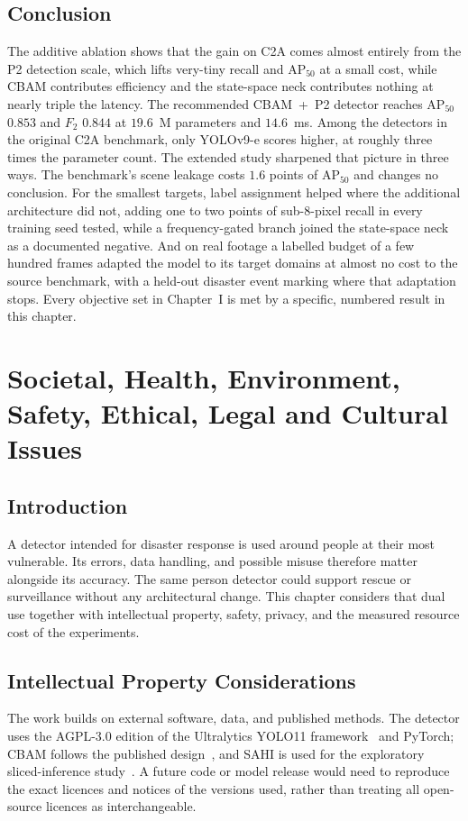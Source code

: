 \documentclass[12pt,a4paper,oneside]{report}
\begin{document}
\section{Conclusion}
The additive ablation shows that the gain on C2A comes almost entirely from
the P2 detection scale, which lifts very-tiny recall and $\mathrm{AP}_{50}$
at a small cost, while CBAM contributes efficiency and the state-space neck
contributes nothing at nearly triple the latency. The recommended CBAM~+~P2
detector reaches $\mathrm{AP}_{50}$ $0.853$ and $F_2$ $0.844$ at $19.6$~M
parameters and $14.6$~ms. Among the detectors in the original C2A benchmark,
only YOLOv9-e scores higher, at roughly three times the parameter count. The
extended study sharpened that picture in three ways. The benchmark's scene
leakage costs $1.6$ points of $\mathrm{AP}_{50}$ and changes no conclusion.
For the smallest targets, label assignment helped where the additional
architecture did not, adding one to two points of sub-8-pixel
recall in every training seed tested, while a frequency-gated branch joined
the state-space neck as a documented negative. And on real footage a labelled
budget of a few hundred frames adapted the model to its target domains at
almost no cost to the source benchmark, with a held-out disaster event
marking where that adaptation stops. Every objective set in Chapter~I is met
by a specific, numbered result in this chapter.
 \newpage 
 \newpage \chapter{Societal, Health, Environment, Safety, Ethical, Legal and Cultural Issues}

\section{Introduction}
A detector intended for disaster response is used around people at their most
vulnerable. Its errors, data handling, and possible misuse therefore matter
alongside its accuracy. The same person detector could support rescue or
surveillance without any architectural change. This chapter considers that
dual use together with intellectual property, safety, privacy, and the measured
resource cost of the experiments.

\section{Intellectual Property Considerations}
The work builds on external software, data, and published methods. The detector
uses the AGPL-3.0 edition of the Ultralytics YOLO11
framework~\cite{jocher2024yolo11} and PyTorch; CBAM
follows the published design~\cite{woo2018cbam}, and SAHI is used for the
exploratory sliced-inference study~\cite{akyon2022sahi}. A future code or model
release would need to reproduce the exact licences and notices of the versions
used, rather than treating all open-source licences as interchangeable.
\end{document}
